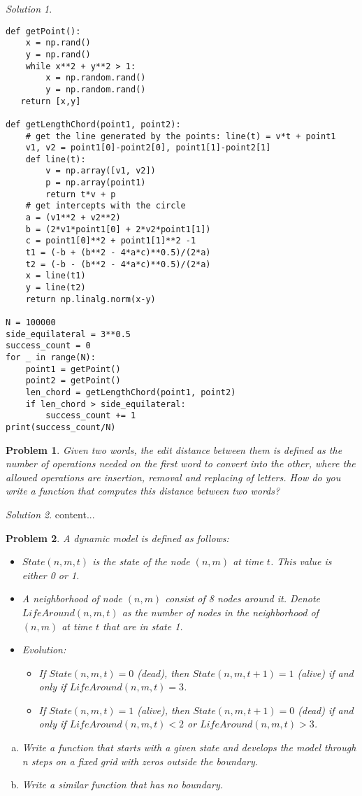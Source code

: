 \documentclass[12pt, letterpaper]{amsart}
\numberwithin{equation}{section} %
\newtheorem{problem}{Problem}
\theoremstyle{definition}
\theoremstyle{remark}
\newtheorem*{solution}{Solution}
\begin{document}
\begin{solution}
\begin{enumerate}[a.]
\begin{lstlisting}
def getPoint():
    x = np.rand()
    y = np.rand()
    while x**2 + y**2 > 1:
        x = np.random.rand()
        y = np.random.rand()
   return [x,y]

def getLengthChord(point1, point2):
    # get the line generated by the points: line(t) = v*t + point1
    v1, v2 = point1[0]-point2[0], point1[1]-point2[1]
    def line(t):
        v = np.array([v1, v2])
        p = np.array(point1)
        return t*v + p
    # get intercepts with the circle
    a = (v1**2 + v2**2)
    b = (2*v1*point1[0] + 2*v2*point1[1])
    c = point1[0]**2 + point1[1]**2 -1
    t1 = (-b + (b**2 - 4*a*c)**0.5)/(2*a)
    t2 = (-b - (b**2 - 4*a*c)**0.5)/(2*a)
    x = line(t1)
    y = line(t2)
    return np.linalg.norm(x-y)

N = 100000
side_equilateral = 3**0.5
success_count = 0
for _ in range(N):
    point1 = getPoint()
    point2 = getPoint()
    len_chord = getLengthChord(point1, point2)
    if len_chord > side_equilateral:
        success_count += 1
print(success_count/N)
\end{lstlisting}
\end{enumerate}
\end{solution}


\begin{problem}
Given two words, the \emph{edit distance} between them is defined as the number of operations needed on the first word to convert into the other, where the allowed operations are insertion, removal and replacing of letters. How do you write a function that computes this distance between two words?
\end{problem}
\begin{solution}
content...
\end{solution}

\begin{problem}
A dynamic model is defined as follows:
\begin{itemize}
\item $State(n,m,t)$ is the state of the node $(n,m)$ at time $t$. This value is either 0 or 1.
\item A neighborhood of node $(n,m)$ consist of 8 nodes around it. Denote $LifeAround(n,m,t)$ as the number of nodes in the neighborhood of $(n,m)$ at time $t$ that are in state 1.
\item Evolution:
    \begin{itemize}
    \item If $State(n,m,t)=0$ (dead), then $State(n,m,t+1)=1$ (alive) if and only if $LifeAround(n,m,t)=3$.
    \item If $State(n,m,t)=1$ (alive), then $State(n,m,t+1)=0$ (dead) if and only if $LifeAround(n,m,t)<2$ or $LifeAround(n,m,t)>3$.
    \end{itemize}
\end{itemize}
\begin{enumerate}[a.]
\item Write a function that starts with a given state and develops the model through n steps on a fixed grid with zeros outside the boundary.
\item Write a similar function that has no boundary.
\end{enumerate}
\end{problem}
\end{document}
